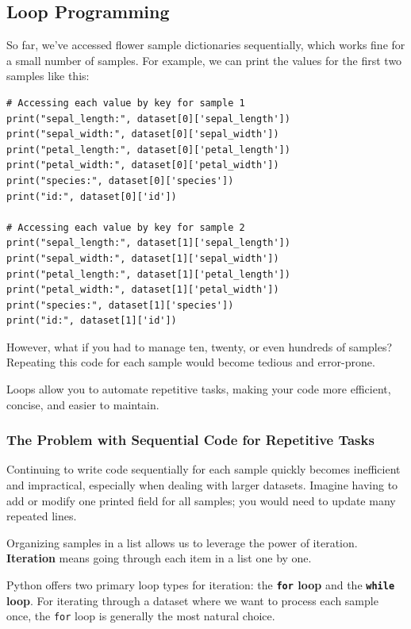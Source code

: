 \subsection{Loop Programming}

So far, we've accessed flower sample dictionaries sequentially, which works fine for a small number of samples. For example, we can print the values for the first two samples like this:

\begin{verbatim}
# Accessing each value by key for sample 1
print("sepal_length:", dataset[0]['sepal_length'])
print("sepal_width:", dataset[0]['sepal_width'])
print("petal_length:", dataset[0]['petal_length'])
print("petal_width:", dataset[0]['petal_width'])
print("species:", dataset[0]['species'])
print("id:", dataset[0]['id'])

# Accessing each value by key for sample 2
print("sepal_length:", dataset[1]['sepal_length'])
print("sepal_width:", dataset[1]['sepal_width'])
print("petal_length:", dataset[1]['petal_length'])
print("petal_width:", dataset[1]['petal_width'])
print("species:", dataset[1]['species'])
print("id:", dataset[1]['id'])
\end{verbatim}

However, what if you had to manage ten, twenty, or even hundreds of samples? Repeating this code for each sample would become tedious and error-prone.

Loops allow you to automate repetitive tasks, making your code more efficient, concise, and easier to maintain.

\subsubsection{The Problem with Sequential Code for Repetitive Tasks}

Continuing to write code sequentially for each sample quickly becomes inefficient and impractical, especially when dealing with larger datasets. Imagine having to add or modify one printed field for all samples; you would need to update many repeated lines.

Organizing samples in a list allows us to leverage the power of iteration. \textbf{Iteration} means going through each item in a list one by one.

Python offers two primary loop types for iteration: the \textbf{\texttt{for} loop} and the \textbf{\texttt{while} loop}. For iterating through a dataset where we want to process each sample once, the \texttt{for} loop is generally the most natural choice.

